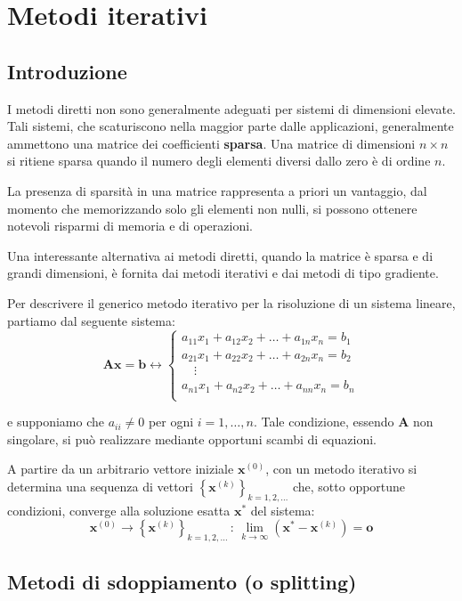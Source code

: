 \chapter{Metodi iterativi}

\section{Introduzione}

I metodi diretti non sono generalmente adeguati per sistemi di dimensioni elevate. Tali sistemi, che
scaturiscono nella maggior parte dalle applicazioni, generalmente ammettono una matrice dei coefficienti
\textbf{sparsa}. Una matrice di dimensioni $n\times n$ si ritiene sparsa quando il numero degli
elementi diversi dallo zero è di ordine $n$.

La presenza di sparsità in una matrice rappresenta a priori un vantaggio, dal momento che memorizzando
solo gli elementi non nulli, si possono ottenere notevoli risparmi di memoria e di operazioni.

Una interessante alternativa ai metodi diretti, quando la matrice è sparsa e di grandi dimensioni,
è fornita dai metodi iterativi e dai metodi di tipo gradiente.

Per descrivere il generico metodo iterativo per la risoluzione di un sistema lineare, partiamo dal
seguente sistema:
\[\mathbf{Ax}=\mathbf{b}\leftrightarrow\begin{cases}
    a_{11}x_1+a_{12}x_2+\dots+a_{1n}x_n=b_1 \\
    a_{21}x_1+a_{22}x_2+\dots+a_{2n}x_n=b_2 \\
    \quad\vdots \\
    a_{n1}x_1+a_{n2}x_2+\dots+a_{nn}x_n=b_n \\
\end{cases}\]

e supponiamo che $a_{ii}\ne0$ per ogni $i=1,\dots,n$. Tale condizione, essendo $\mathbf{A}$ non
singolare, si può realizzare mediante opportuni scambi di equazioni.

A partire da un arbitrario vettore iniziale $\mathbf{x}^{(0)}$, con un metodo iterativo si determina
una sequenza di vettori $\left\{\mathbf{x}^{(k)}\right\}_{k=1,2,\dots}$ che, sotto opportune condizioni, converge
alla soluzione esatta $\mathbf{x}^*$ del sistema:
\[\mathbf{x}^{(0)}\to\left\{\mathbf{x}^{(k)}\right\}_{k=1,2,\dots}\,:\,\lim_{k\to\infty}\left(\mathbf{x}^*-
\mathbf{x}^{(k)}\right)=\mathbf{o}\]

\section{Metodi di sdoppiamento (o splitting)}

